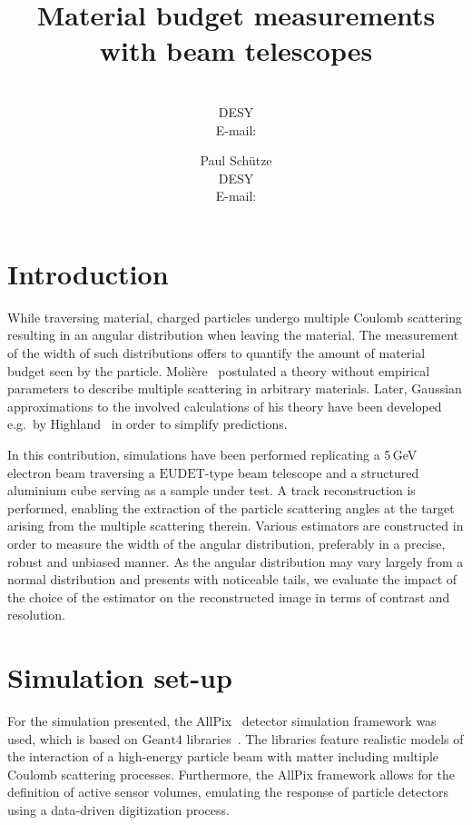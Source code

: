 \documentclass{PoS}
\title{Material budget measurements with beam telescopes}
\author{\speaker{Hendrik Jansen}\\
        DESY\\
        E-mail: \email{hendrik.jansen@desy.de}}
\author{Paul Sch\"utze\\
        DESY\\
        E-mail: \email{paul.schuetze@desy.de}}
\newcommand{\eudet}{\ensuremath{\textrm{EUDET}}}
\newcommand{\Geant}{\ensuremath{\textrm{Geant4}}}
\begin{document}
\linenumbers
\section{Introduction}
While traversing material, charged particles undergo multiple Coulomb scattering resulting in an angular distribution when leaving the material. 
The measurement of the width of such distributions offers to quantify the amount of material budget seen by the particle. 
Moli\`ere~\cite{moliere} postulated a theory without empirical parameters to describe multiple scattering in arbitrary materials.
Later, Gaussian approximations to the involved calculations of his theory have been developed e.g.\ by Highland~\cite{ref:scatteringhighland} in order to simplify predictions.

In this contribution, simulations have been performed replicating a 5\,GeV electron beam traversing a $\eudet$-type beam telescope \cite{JansenEPJ} and a structured aluminium cube serving as a sample under test. 
A track reconstruction is performed, enabling the extraction of the particle scattering angles at the target arising from the multiple scattering therein.
Various estimators are constructed in order to measure the width of the angular distribution, preferably  in a precise, robust and unbiased manner. 
As the angular distribution may vary largely from a normal distribution and presents with noticeable tails,
 we evaluate the impact of the choice of the estimator on the reconstructed image in terms of contrast and resolution. 


\section{Simulation set-up}
For the simulation presented, the AllPix~\cite{ref:AllPix} detector simulation framework was used, which is based on $\Geant$ libraries~\cite{Agostinelli2003250,1610988}.
The libraries feature realistic models of the interaction of a high-energy particle beam with matter including multiple Coulomb scattering processes.
Furthermore, the AllPix framework allows for the definition of active sensor volumes, emulating the response of particle detectors using a data-driven digitization process. 
\end{document}
